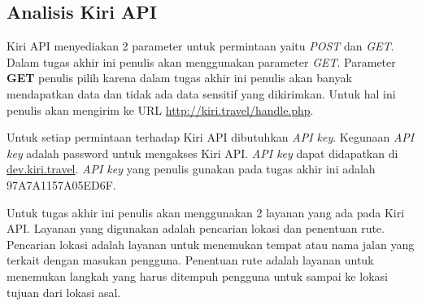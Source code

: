 \subsection{Analisis Kiri API}
\label{lab:Analisis Kiri API}
\hspace{0.5cm} Kiri API menyediakan 2 parameter untuk permintaan yaitu \textit{POST} dan \textit{GET}. Dalam tugas akhir ini penulis akan menggunakan parameter \textit{GET}. Parameter \textbf{GET} penulis pilih karena dalam tugas akhir ini penulis akan banyak mendapatkan data dan tidak ada data sensitif yang dikirimkan. Untuk hal ini penulis akan mengirim ke URL \url{http://kiri.travel/handle.php}.

\hspace{0.5cm} Untuk setiap permintaan terhadap Kiri API dibutuhkan \textit{API key}. Kegunaan \textit{API key} adalah password untuk mengakses Kiri API. \textit{API key} dapat didapatkan di \url{dev.kiri.travel}. \textit{API key} yang penulis gunakan pada tugas akhir ini adalah 97A7A1157A05ED6F.
     
\hspace{0.5cm} Untuk tugas akhir ini penulis akan menggunakan 2 layanan yang ada pada Kiri API. Layanan yang digunakan adalah pencarian lokasi dan penentuan rute. Pencarian lokasi adalah layanan untuk menemukan tempat atau nama jalan yang terkait dengan masukan pengguna. Penentuan rute adalah layanan untuk menemukan langkah yang harus ditempuh pengguna untuk sampai ke lokasi tujuan dari lokasi asal. 

